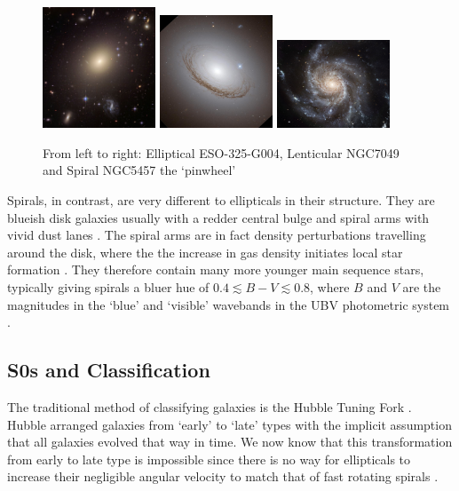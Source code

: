 \begin{figure}[h]
	\centering
	\includegraphics[width=0.3\textwidth, height=0.25\textheight]{figs/elliptical_ESO_325-G004.jpg}
	\includegraphics[width=0.3\textwidth, height=0.25\textheight]{figs/S0_NGC7049.jpg}
	\includegraphics[width=0.3\textwidth, height=0.25\textheight]{figs/spiral_NGC5457_pinwheel.jpg}
	\label{galaxy type pictures}
	\caption{\footnotesize{From left to right: Elliptical ESO-325-G004, Lenticular NGC7049 and Spiral NGC5457 the `pinwheel'}}
\end{figure}

Spirals, in contrast, are very different to ellipticals in their structure. They are blueish disk galaxies usually with a redder central bulge and spiral arms with vivid dust lanes \citep{sparke_galaxies_2000}. The spiral arms are in fact density perturbations travelling around the disk, where the the increase in gas density initiates local star formation \citep{kennicutt_star_1998}. They therefore contain many more younger  main sequence stars, typically giving spirals a bluer hue of $0.4\lesssim B-V \lesssim 0.8$, where $B$ and $V$ are the magnitudes in the `blue' and `visible' wavebands in the UBV photometric system \citep{sparke_galaxies_2000}.

\subsection{S0s and Classification}
The traditional method of classifying galaxies is the Hubble Tuning Fork \citep{hubble_no._1926}. Hubble arranged galaxies from `early' to `late' types with the implicit assumption that all galaxies evolved that way in time. We now know that this transformation from early to late type is impossible since there is no way for ellipticals to increase their negligible angular velocity to match that of fast rotating spirals \citep{carroll_introduction_2007}. 

